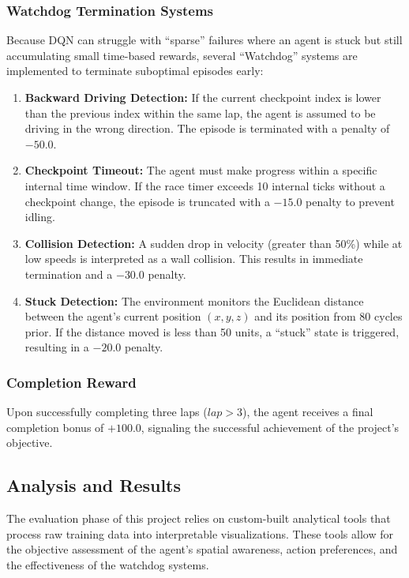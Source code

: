 \documentclass[11pt,a4paper]{article}
\begin{document}
\subsubsection{Watchdog Termination Systems}
Because DQN can struggle with ``sparse'' failures where an agent is stuck but still accumulating small time-based rewards, several ``Watchdog'' systems are implemented to terminate suboptimal episodes early:
\begin{enumerate}
    \item \textbf{Backward Driving Detection:} If the current checkpoint index is lower than the previous index within the same lap, the agent is assumed to be driving in the wrong direction. The episode is terminated with a penalty of $-50.0$.
    \item \textbf{Checkpoint Timeout:} The agent must make progress within a specific internal time window. If the race timer exceeds 10 internal ticks without a checkpoint change, the episode is truncated with a $-15.0$ penalty to prevent idling.
    \item \textbf{Collision Detection:} A sudden drop in velocity (greater than 50\%) while at low speeds is interpreted as a wall collision. This results in immediate termination and a $-30.0$ penalty.
    \item \textbf{Stuck Detection:} The environment monitors the Euclidean distance between the agent's current position $(x, y, z)$ and its position from 80 cycles prior. If the distance moved is less than 50 units, a ``stuck'' state is triggered, resulting in a $-20.0$ penalty.
\end{enumerate}

\subsubsection{Completion Reward}
Upon successfully completing three laps ($lap > 3$), the agent receives a final completion bonus of $+100.0$, signaling the successful achievement of the project's objective.

\subsection{Analysis and Results}
The evaluation phase of this project relies on custom-built analytical tools that process raw training data into interpretable visualizations. These tools allow for the objective assessment of the agent's spatial awareness, action preferences, and the effectiveness of the watchdog systems.
\end{document}
